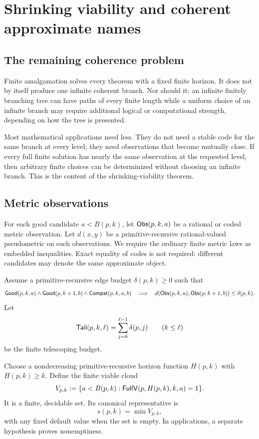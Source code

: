 \section{Shrinking viability and coherent approximate names}
\label{sec:shrinking}

\subsection{The remaining coherence problem}

Finite amalgamation solves every theorem with a fixed finite horizon.  It does
not by itself produce one infinite coherent branch.  Nor should it: an
infinite finitely branching tree can have paths of every finite length while a
uniform choice of an infinite branch may require additional logical or
computational strength, depending on how the tree is presented.

Most mathematical applications need less.  They do not need a stable code for
the same branch at every level; they need observations that become mutually
close.  If every full finite solution has nearly the same observation at the
requested level, then arbitrary finite choices can be determinized without
choosing an infinite branch.  This is the content of the shrinking-viability
theorem.

\subsection{Metric observations}

For each good candidate \(a<B(p,k)\), let
\(\mathsf{Obs}(p,k,a)\) be a rational or coded metric observation.  Let
\(d(x,y)\) be a primitive-recursive rational-valued pseudometric on such
observations.  We require the ordinary finite metric laws as embedded
inequalities.  Exact equality of codes is not required: different candidates
may denote the same approximate object.

Assume a primitive-recursive edge budget \(\delta(p,k)\ge0\) such that
\begin{equation}
 \mathsf{Good}(p,k,a)\wedge\mathsf{Good}(p,k+1,b)\wedge\mathsf{Compat}(p,k,a,b)
 \quad\Longrightarrow\quad
 d(\mathsf{Obs}(p,k,a),\mathsf{Obs}(p,k+1,b))\le\delta(p,k).
 \label{eq:edge-budget}
\end{equation}
Let
\[
 \mathsf{Tail}(p,k,\ell)=\sum_{j=k}^{\ell-1}\delta(p,j)
 \qquad(k\le\ell)
\]
be the finite telescoping budget.

Choose a nondecreasing primitive-recursive horizon function \(H(p,k)\) with
\(H(p,k)\ge k\).  Define the finite viable cloud
\[
 V_{p,k}:=\{a<B(p,k):\mathsf{FullV}(p,H(p,k),k,a)=1\}.
\]
It is a finite, decidable set.  Its canonical representative is
\[
 s(p,k)=\min V_{p,k},
\]
with any fixed default value when the set is empty.  In applications, a
separate hypothesis proves nonemptiness.

